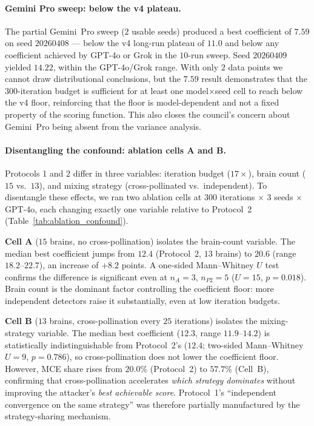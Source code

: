 \documentclass{article}
\begin{document}
\paragraph{Gemini Pro sweep: below the v4 plateau.}
The partial Gemini~Pro sweep ($2$ usable seeds) produced a
best coefficient of $\mathbf{7.59}$ on seed $20260408$ --- below the
v4 long-run plateau of $11.0$ and below any coefficient achieved by
GPT-4o or Grok in the $10$-run sweep. Seed $20260409$ yielded
$14.22$, within the GPT-4o/Grok range. With only $2$ data points
we cannot draw distributional conclusions, but the $7.59$ result
demonstrates that the $300$-iteration budget is sufficient for at
least one model$\times$seed cell to reach below the v4 floor,
reinforcing that the floor is model-dependent and not a fixed
property of the scoring function. This also closes the council's
concern about Gemini~Pro being absent from the variance analysis.

\paragraph{Disentangling the confound: ablation cells A and B.}
Protocols 1 and 2 differ in three variables: iteration budget
($17\!\times$), brain count ($15$ vs.\ $13$), and mixing strategy
(cross-pollinated vs.\ independent). To disentangle these effects,
we ran two ablation cells at $300$ iterations $\times$ $3$ seeds
$\times$ GPT-4o, each changing exactly one variable relative to
Protocol~2 (Table~\ref{tab:ablation_confound}).

\textbf{Cell A} ($15$ brains, no cross-pollination) isolates the
brain-count variable. The median best coefficient jumps from $12.4$
(Protocol~2, $13$ brains) to $\mathbf{20.6}$ (range $18.2$--$22.7$),
an increase of $+8.2$ points. A one-sided Mann--Whitney $U$ test
confirms the difference is significant even at $n_A\!=\!3$,
$n_{P2}\!=\!5$ ($U=15$, $p=0.018$). Brain count is the dominant
factor controlling the coefficient floor: more independent detectors
raise it substantially, even at low iteration budgets.

\textbf{Cell B} ($13$ brains, cross-pollination every $25$ iterations)
isolates the mixing-strategy variable. The median best coefficient
($12.3$, range $11.9$--$14.2$) is statistically indistinguishable
from Protocol~2's ($12.4$; two-sided Mann--Whitney $U=9$, $p=0.786$),
so cross-pollination does not lower the coefficient floor. However,
MCE share rises from $20.0\%$ (Protocol~2) to $57.7\%$ (Cell~B),
confirming that cross-pollination accelerates \emph{which strategy
dominates} without improving the attacker's \emph{best achievable
score}. Protocol~1's ``independent convergence on the same strategy''
was therefore partially manufactured by the strategy-sharing mechanism.
\end{document}
